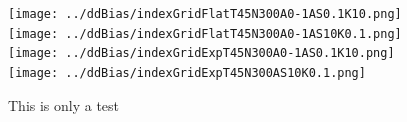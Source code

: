 %
\begin{figure}[h!]
\texttt{[image: ../ddBias/indexGridFlatT45N300A0-1AS0.1K10.png]}
\texttt{[image: ../ddBias/indexGridFlatT45N300A0-1AS10K0.1.png]}
\texttt{[image: ../ddBias/indexGridExpT45N300A0-1AS0.1K10.png]}
\texttt{[image: ../ddBias/indexGridExpT45N300AS10K0.1.png]}
\vspace{-1.5cm}
\caption{This is only a test}
\label{rpSpace}
\end{figure}

\clearpage

